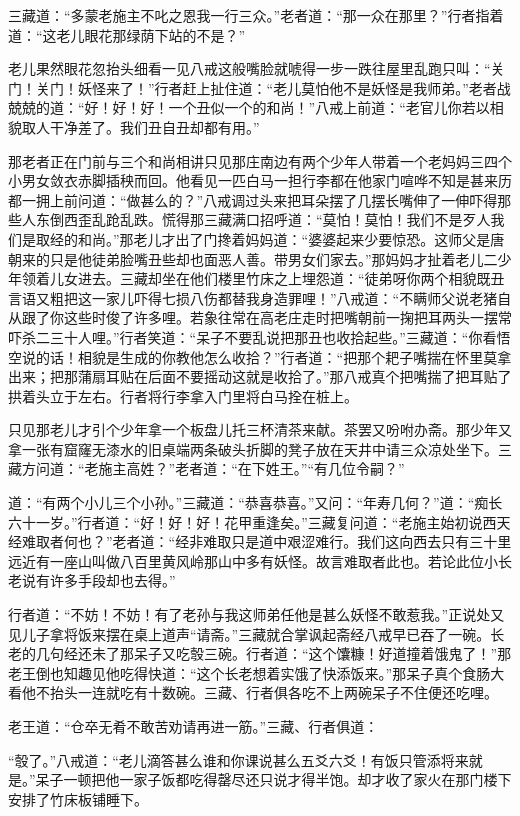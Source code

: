 \documentclass[12pt,UTF8]{ctexbook}
\begin{document}
三藏道：“多蒙老施主不叱之恩我一行三众。”老者道：“那一众在那里？”行者指着道：“这老儿眼花那绿荫下站的不是？”

老儿果然眼花忽抬头细看一见八戒这般嘴脸就唬得一步一跌往屋里乱跑只叫：“关门！关门！妖怪来了！”行者赶上扯住道：“老儿莫怕他不是妖怪是我师弟。”老者战兢兢的道：“好！好！好！一个丑似一个的和尚！”八戒上前道：“老官儿你若以相貌取人干净差了。我们丑自丑却都有用。”

那老者正在门前与三个和尚相讲只见那庄南边有两个少年人带着一个老妈妈三四个小男女敛衣赤脚插秧而回。他看见一匹白马一担行李都在他家门喧哗不知是甚来历都一拥上前问道：“做甚么的？”八戒调过头来把耳朵摆了几摆长嘴伸了一伸吓得那些人东倒西歪乱跄乱跌。慌得那三藏满口招呼道：“莫怕！莫怕！我们不是歹人我们是取经的和尚。”那老儿才出了门搀着妈妈道：“婆婆起来少要惊恐。这师父是唐朝来的只是他徒弟脸嘴丑些却也面恶人善。带男女们家去。”那妈妈才扯着老儿二少年领着儿女进去。三藏却坐在他们楼里竹床之上埋怨道：“徒弟呀你两个相貌既丑言语又粗把这一家儿吓得七损八伤都替我身造罪哩！”八戒道：“不瞒师父说老猪自从跟了你这些时俊了许多哩。若象往常在高老庄走时把嘴朝前一掬把耳两头一摆常吓杀二三十人哩。”行者笑道：“呆子不要乱说把那丑也收拾起些。”三藏道：“你看悟空说的话！相貌是生成的你教他怎么收拾？”行者道：“把那个耙子嘴揣在怀里莫拿出来；把那蒲扇耳贴在后面不要摇动这就是收拾了。”那八戒真个把嘴揣了把耳贴了拱着头立于左右。行者将行李拿入门里将白马拴在桩上。

只见那老儿才引个少年拿一个板盘儿托三杯清茶来献。茶罢又吩咐办斋。那少年又拿一张有窟窿无漆水的旧桌端两条破头折脚的凳子放在天井中请三众凉处坐下。三藏方问道：“老施主高姓？”老者道：“在下姓王。”“有几位令嗣？”

道：“有两个小儿三个小孙。”三藏道：“恭喜恭喜。”又问：“年寿几何？”道：“痴长六十一岁。”行者道：“好！好！好！花甲重逢矣。”三藏复问道：“老施主始初说西天经难取者何也？”老者道：“经非难取只是道中艰涩难行。我们这向西去只有三十里远近有一座山叫做八百里黄风岭那山中多有妖怪。故言难取者此也。若论此位小长老说有许多手段却也去得。”

行者道：“不妨！不妨！有了老孙与我这师弟任他是甚么妖怪不敢惹我。”正说处又见儿子拿将饭来摆在桌上道声“请斋。”三藏就合掌讽起斋经八戒早已吞了一碗。长老的几句经还未了那呆子又吃彀三碗。行者道：“这个馕糠！好道撞着饿鬼了！”那老王倒也知趣见他吃得快道：“这个长老想着实饿了快添饭来。”那呆子真个食肠大看他不抬头一连就吃有十数碗。三藏、行者俱各吃不上两碗呆子不住便还吃哩。

老王道：“仓卒无肴不敢苦劝请再进一筋。”三藏、行者俱道：

“彀了。”八戒道：“老儿滴答甚么谁和你课说甚么五爻六爻！有饭只管添将来就是。”呆子一顿把他一家子饭都吃得罄尽还只说才得半饱。却才收了家火在那门楼下安排了竹床板铺睡下。
\end{document}
